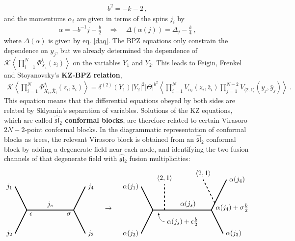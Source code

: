 \documentclass[12pt, a4paper, notitlepage, twoside]{report}
\numberwithin{equation}{section}
\theoremstyle{break}
\begin{document}
\begin{align}
 \boxed{ b^2 = -k-2}\ ,
\label{bk}
\end{align}
and the momentums $\alpha_i$ are given in terms of the spins $j_i$ by 
\begin{align}
 \boxed{\alpha = -b^{-1}j+\frac{b}{2}}\quad \Rightarrow \quad \boxed{\Delta(\alpha(j)) = \Delta_j-\frac{k}{4}}\ ,
\label{aj}
\end{align}
where $\Delta(\alpha)$ is given by eq. \eqref{daq}.
The BPZ equations only constrain the dependence on $y_j$, but we already determined the dependence of  
$\mathcal{K}\left\langle \prod_{i=1}^N \Phi^{j_i}_{X_i}(z_i)\right\rangle$ on the variables $Y_1$ and $Y_2$.
This leads to Feigin, Frenkel and Stoyanovsky's \textbf{\boldmath KZ-BPZ relation},
\begin{align}
 \boxed{ \mathcal{K}\left\langle \prod_{i=1}^N \Phi^{j_i}_{X_i,\bar{X}_i}(z_i,\bar{z}_i)\right\rangle = \delta^{(2)}(Y_1) |Y_2|^2 |\Theta|^{b^2} \left\langle \prod_{i=1}^N V_{\alpha_i}(z_i,\bar{z}_i)\prod_{j=1}^{N-2}V_{\langle 2,1\rangle}(y_j,\bar{y}_j)\right\rangle}\ .
\label{dyy}
\end{align}
This equation means that the differential equations obeyed by both sides are related by Sklyanin's separation of variables. 
Solutions of the KZ equations, which are called \textbf{\boldmath $\widehat{\mathfrak{sl}}_2$ conformal blocks}, are therefore related to certain Virasoro $2N-2$-point conformal blocks. 
In the diagrammatic representation of conformal blocks as trees, the relevant Virasoro block is obtained from an $\widehat{\mathfrak{sl}}_2$ conformal block by adding a degenerate field near each node, and identifying the two fusion channels of that degenerate field with $\widehat{\mathfrak{sl}}_2$ fusion multiplicities:
\begin{align}
\begin{tikzpicture}[baseline={(0,0)}, very thick, scale = .6]
\draw (-1,2) node [left] {$j_1$} -- (0,0) node[below right] {$\epsilon$} -- node [above] {$j_s$} (4,0) node[below left] {$\sigma$} -- (5,2) node [right] {$j_4$};
\draw (-1,-2) node [left] {$j_2$} -- (0,0);
\draw (4,0) -- (5,-2) node [right] {$j_3$};
\end{tikzpicture}
\quad \rightarrow \quad  
\begin{tikzpicture}[baseline={(0,0)}, very thick, scale = .6]
\draw (-1,2) node [left] {$\alpha(j_1)$} -- (0,0) -- (1,0) -- node [above] {$\alpha(j_s)$} (5,0) -- (6.3,2.6) node [right] {$\alpha(j_4)$};
\draw (-1,-2) node [left] {$\alpha(j_2)$} -- (0,0);
\draw (5,0) -- (6,-2) node [right] {$\alpha(j_3)$};
\draw[dashed] (1,0) -- (1,2.2) node[above] {$\left<2,1\right>$};
\draw[dashed] (5.3, .6) -- (4.3, 2.6) node[above] {$\left<2,1\right>$};
\node[right] at (5.15, .2) {$\alpha(j_4)+\sigma \frac{b}{2}$};
\draw[thin, latex-] (.5, -.2) to[out = -90, in = 180] (1,-1) node [right] {$\alpha(j_s) + \epsilon \frac{b}{2}$};
\end{tikzpicture}
\end{align}
\end{document}
